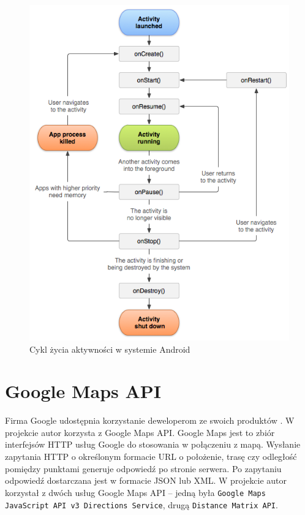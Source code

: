 \documentclass[eng,printmode,oneside]{mgr}
\begin{document}
\begin{figure}[ht!]
\centering
\includegraphics[width=80ex]{andActivityLifecycle.png}
\caption{Cykl życia aktywności w systemie Android \cite{developer.android}}
\label{fig:andActivityLifecycle}
\end{figure}

\section{Google Maps API}

Firma Google udostępnia korzystanie deweloperom ze swoich produktów
\cite{developer.google}. W projekcie autor korzysta z Google Maps API. Google
Maps jest to zbiór interfejsów HTTP usług Google do stosowania w połączeniu z
mapą. Wysłanie zapytania HTTP o określonym formacie URL o położenie, trasę czy
odległość pomiędzy punktami generuje odpowiedź po stronie serwera. Po zapytaniu
odpowiedź dostarczana jest w formacie JSON lub XML. W projekcie autor korzystał z dwóch
usług Google Maps API -- jedną była \texttt{Google Maps JavaScript API v3
Directions Service}, drugą \texttt{Distance Matrix API}.
\end{document}
